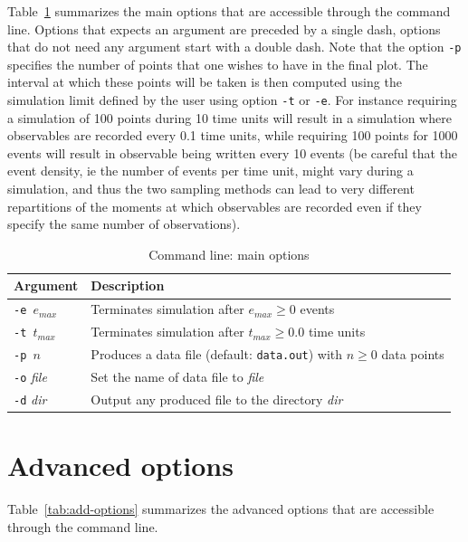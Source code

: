 \documentclass[11pt]{book}
\def\ttt#1{\texttt{#1}}
\def\ie{ie }
\def\mit#1{{\mathit #1}}
\begin{document}
Table~\ref{tab:options} summarizes the main options that are accessible through the command line. Options that expects an argument are preceded by a single dash, options that do not need any argument start with a double dash. Note that the option \ttt{-p} specifies the number of points that one wishes to have in the final plot. The interval at which these points will be taken is then computed using the simulation limit defined by the user using option \ttt{-t} or \ttt{-e}. For instance requiring a simulation of 100 points during 10 time units will result in a simulation where observables are recorded every 0.1 time units, while requiring 100 points for 1000 events will result in observable being written every 10 events (be careful that the event density, \ie the number of events per time unit, might vary during a simulation, and thus the two sampling methods can lead to very different repartitions of the moments at which observables are recorded even if they specify the same number of observations). 

\begin{table}[htdp]
\caption{Command line: main options}
\begin{center}
\begin{tabular}{|l|l|}
\hline 
Argument & Description \\ \hline
\ttt{-e $e_\mit{max}$} & Terminates simulation after $e_\mit{max}\geq 0$ events\\
\ttt{-t $t_\mit{max}$} & Terminates simulation after $t_\mit{max}\geq 0.0$ time units\\
\ttt{-p $n$} & Produces a data file\index{data file} (default: \ttt{data.out}) with $n\geq 0$ data points\\
\ttt{-o} \textit{file} & Set the name of data file to \textit{file}\\ 
\ttt{-d} \textit{dir} & Output any produced file to the directory \textit{dir}\\
\hline
\end{tabular}
\end{center}
\label{tab:options}
\end{table}%

\section{Advanced options}

Table~\ref{tab:add-options} summarizes the advanced options that are accessible through the command line.
\end{document}
